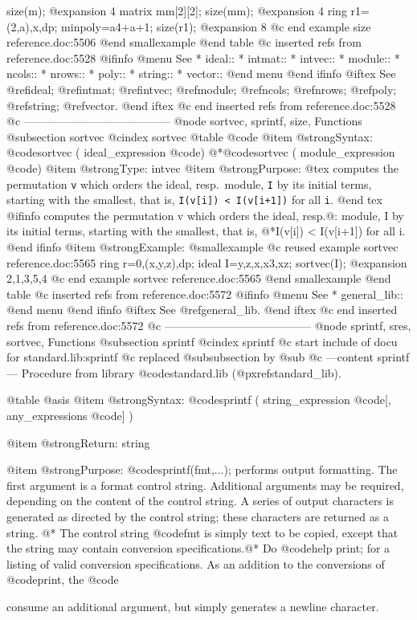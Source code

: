 {{{{{{  size(m);
@expansion{} 4
  matrix mm[2][2];
  size(mm);
@expansion{} 4
  ring r1=(2,a),x,dp;
  minpoly=a4+a+1;
  size(r1);
@expansion{} 8
@c end example size reference.doc:5506
@end smallexample
@end table
@c inserted refs from reference.doc:5528
@ifinfo
@menu
See
* ideal::
* intmat::
* intvec::
* module::
* ncols::
* nrows::
* poly::
* string::
* vector::
@end menu
@end ifinfo
@iftex
See
@ref{ideal};
@ref{intmat};
@ref{intvec};
@ref{module};
@ref{ncols};
@ref{nrows};
@ref{poly};
@ref{string};
@ref{vector}.
@end iftex
@c end inserted refs from reference.doc:5528
@c ---------------------------------------
@node sortvec, sprintf, size, Functions
@subsection sortvec
@cindex sortvec
@table @code
@item @strong{Syntax:}
@code{sortvec (} ideal_expression @code{)}
@*@code{sortvec (} module_expression @code{)}
@item @strong{Type:}
intvec
@item @strong{Purpose:}
@tex
computes the permutation {\tt v}
which orders the ideal, resp.\ module, {\tt I} by its initial terms,
starting with the smallest, that is, {\tt I(v[i]) < I(v[i+1])} for all
{\tt i}.
@end tex
@ifinfo
computes the permutation v
which orders the ideal, resp.@: module, I by its initial terms,
starting with the smallest, that is,
@*I(v[i]) < I(v[i+1]) for all i.
@end ifinfo
@item @strong{Example:}
@smallexample
@c reused example sortvec reference.doc:5565 
  ring r=0,(x,y,z),dp;
  ideal I=y,z,x,x3,xz;
  sortvec(I);
@expansion{} 2,1,3,5,4
@c end example sortvec reference.doc:5565
@end smallexample
@end table
@c inserted refs from reference.doc:5572
@ifinfo
@menu
See
* general_lib::
@end menu
@end ifinfo
@iftex
See
@ref{general_lib}.
@end iftex
@c end inserted refs from reference.doc:5572
@c ---------------------------------------
@node sprintf, sres, sortvec, Functions
@subsection sprintf
@cindex sprintf
@c start include of docu for standard.lib:sprintf
@c replaced @subsubsection by @sub
@c ---content sprintf---
Procedure from library @code{standard.lib} (@pxref{standard_lib}).

@table @asis
@item @strong{Syntax:}
@code{sprintf (} string_expression @code{[,} any_expressions
@code{] )}

@item @strong{Return:}
string

@item @strong{Purpose:}
@code{sprintf(fmt,...);} performs output formatting. The first
argument is a format control string. Additional arguments may be
required, depending on the content of the control string. A series
of output characters is generated as directed by the control string;
these characters are returned as a string. @*
The control string @code{fmt} is simply text to be copied,
except that the string may contain conversion specifications.@*
Do @code{help print;} for a listing of valid conversion
specifications. As an addition to the conversions of @code{print},
the @code{%
consume an additional argument, but simply generates a newline
character.

}}}}}}}
